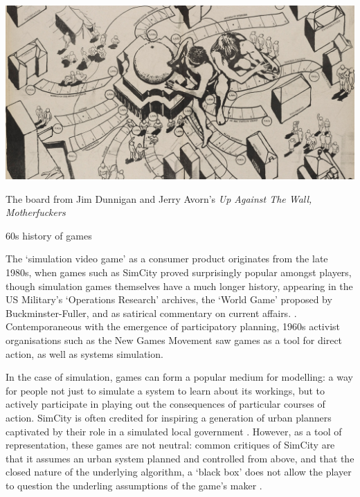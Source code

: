 \documentclass[nofonts,nols,justified,nobib]{tufte-book}
\begin{document}
\begin{marginfigure}
\includegraphics[width=\textwidth]{img/1/up-against-the-wall-motherfucker.jpg}
\caption{The board from Jim Dunnigan and Jerry Avorn's \emph{Up Against The Wall, Motherfuckers}\label{b} \cite{dunnigan_few_1969}}
\end{marginfigure}

60s history of games

The `simulation video game' as a consumer product originates from the late 1980s, when games such as SimCity proved surprisingly popular amongst players, though simulation games themselves have a much longer history, appearing in the US Military's `Operations Research' archives, the `World Game' proposed by Buckminster-Fuller\cite{buckminster_fuller_institute_about_nodate}, and as satirical commentary on current affairs. . Contemporaneous with the emergence of participatory planning, 1960s activist organisations such as the New Games Movement saw games as a tool for direct action, as well as systems simulation. 

In the case of simulation, games can form a popular medium for modelling: a way for people not just to simulate a system to learn about its workings, but to actively participate in playing out the consequences of particular courses of action. SimCity is often credited for inspiring a generation of urban planners captivated by their role in a simulated local government \cite{roy_video_2019}. However, as a tool of representation, these games are not neutral: common critiques of SimCity are that it assumes an urban system planned and controlled from above, and that the closed nature of the underlying algorithm, a `black box' does not allow the player to question the underling assumptions of the game's maker \cite{starr_seductions_1994}.
\end{document}
